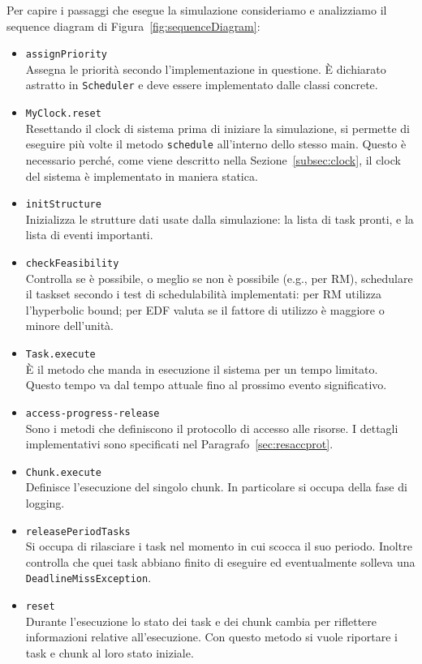 Per capire i passaggi che esegue la simulazione consideriamo e analizziamo il sequence diagram di Figura~\ref{fig:sequenceDiagram}:
\begin{itemize}
    \item \texttt{assignPriority} \\
        Assegna le priorità secondo l'implementazione in questione. È dichiarato astratto in \texttt{Scheduler} e deve essere implementato dalle classi concrete.
    \item \texttt{MyClock.reset} \\
        Resettando il clock di sistema prima di iniziare la simulazione, si permette di eseguire più volte il metodo \texttt{schedule} all'interno dello stesso main. Questo è necessario perché, come viene descritto nella Sezione~\ref{subsec:clock}, il clock del sistema è implementato in maniera statica.
    \item \texttt{initStructure} \\
        Inizializza le strutture dati usate dalla simulazione: la lista di task pronti, e la lista di eventi importanti.
    \item \texttt{checkFeasibility} \\
        Controlla se è possibile, o meglio se non è possibile (e.g., per RM), schedulare il taskset secondo i test di schedulabilità implementati: per RM utilizza l'hyperbolic bound; per EDF valuta se il fattore di utilizzo è maggiore o minore dell'unità.
    \item \texttt{Task.execute} \\
        È il metodo che manda in esecuzione il sistema per un tempo limitato. Questo tempo va dal tempo attuale fino al prossimo evento significativo.
    \item \texttt{access-progress-release} \\
        Sono i metodi che definiscono il protocollo di accesso alle risorse. I dettagli implementativi sono specificati nel Paragrafo~\ref{sec:resaccprot}.
    \item \texttt{Chunk.execute} \\
        Definisce l'esecuzione del singolo chunk. In particolare si occupa della fase di logging.
    \item \texttt{releasePeriodTasks} \\
        Si occupa di rilasciare i task nel momento in cui scocca il suo periodo. Inoltre controlla che quei task abbiano finito di eseguire ed eventualmente solleva una \texttt{DeadlineMissException}.
    \item \texttt{reset} \\
        Durante l'esecuzione lo stato dei task e dei chunk cambia per riflettere informazioni relative all'esecuzione. Con questo metodo si vuole riportare i task e chunk al loro stato iniziale.
\end{itemize}

